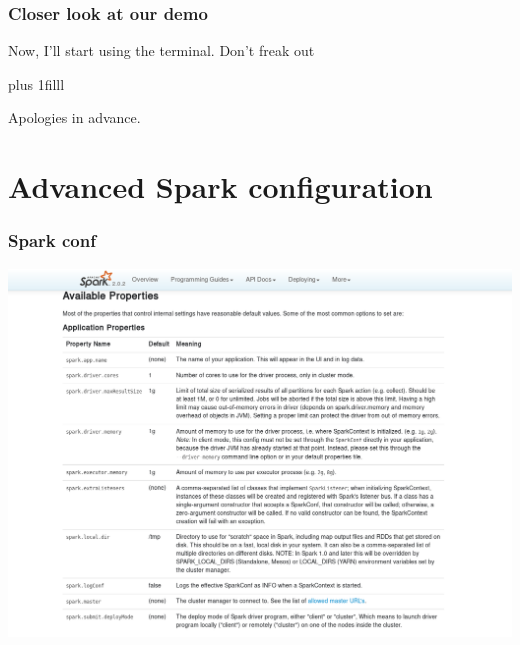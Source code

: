 \documentclass{beamer}
\newcommand{\btVFill}{\vskip0pt plus 1filll}
\begin{document}
\begin{frame}
  \frametitle{Closer look at our demo}
  
  \center
{\huge  Now, I'll start using the terminal.}
\pause
{\huge Don't freak out}
\end{frame}

\begin{frame}[plain]

\btVFill

\center
\Large Apologies in advance.
\vfill

\end{frame}

\section{Advanced Spark configuration}

\begin{frame}[fragile]
  \frametitle{Spark conf}
  \centering
\href{http://spark.apache.org/docs/latest/configuration.html}{\includegraphics[width=\textwidth]{images/spark-conf.png}}

\end{frame}
\end{document}
